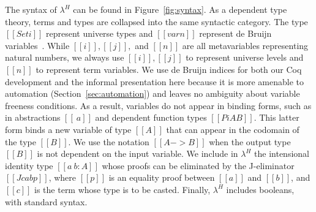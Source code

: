 \documentclass[acmsmall,screen=true,
\ifpublic review=false\else,review=true\fi
  ,anonymous=\ifanonymous true\else false\fi]{acmart}
\newcommand{\lang}{$\lambda^H$\xspace}
\newcommand{\scw}[1]{}
\begin{document}
The syntax of \lang can be found in Figure~\ref{fig:syntax}.  As a dependent
type theory, terms and types are collapsed into the same syntactic
category. The type $[[Set i]]$ represent universe types and $[[var n]]$
represent de Bruijn variables~\cite{debruijn}.  While $[[i]],[[j]],$ and
$[[n]]$ are all metavariables representing natural numbers, we always use
$[[i]],[[j]]$ to represent universe levels and $[[n]]$ to represent term
variables.  We use de Bruijn indices for both our Coq development and the
informal presentation here because it is more amenable to automation
(Section~\ref{sec:automation}) and leaves no ambiguity about variable freeness
conditions. As a result, variables do not appear in binding forms, such as in
abstractions $[[ \ a ]]$ and dependent function types $[[Pi A B]]$.  This latter
form binds a new variable of type $[[A]]$ that can appear in the codomain of
the type $[[B]]$.  We use the notation $[[A -> B]]$ when the output type
$[[B]]$ is not dependent on the input variable.
We include in \lang{} the intensional identity type
$[[a ~ b : A]]$ whose proofs can be eliminated by the J-eliminator
$[[J c a b p]]$, where $[[p]]$ is an equality proof between $[[a]]$ and
$[[b]]$, and $[[c]]$ is the term whose type is to be casted.
Finally, \lang{} includes booleans, with standard syntax.
\scw{Example of
 what you can use identity types for? Or an example of a program that uses
J?}

\end{document}
